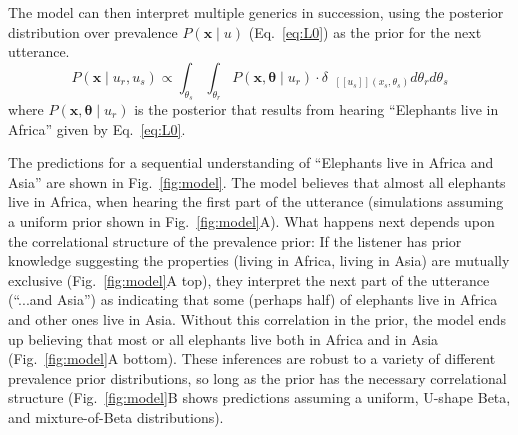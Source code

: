 \documentclass[10pt,letterpaper]{article}
\newcommand{\denote}[1]{\mbox{ $[\![ #1 ]\!]$}}
\begin{document}
The model can then interpret multiple generics in succession, using the posterior distribution over prevalence $P(\textbf{x} \mid u)$ (Eq.~\ref{eq:L0}) as the prior for the next utterance. 
\begin{equation}
P(\textbf{x} \mid u_{r}, u_{s}) \propto  \int_{\theta_s} \int_{\theta_r}P(\textbf{x}, \boldsymbol{\theta} \mid u_{r})  \cdot \delta_{\denote{u_{s}}(x_{s}, \theta_{s})} d\theta_r d\theta_s%
\label{eq:L0a}
\end{equation}
\noindent where $P(\textbf{x}, \boldsymbol{\theta} \mid u_{r})$  is the posterior that results from hearing ``Elephants live in Africa'' given by Eq.~\ref{eq:L0}.

The predictions for a sequential understanding of ``Elephants live in Africa and Asia'' are shown in Fig.~\ref{fig:model}.
The model believes that almost all elephants live in Africa, when hearing the first part of the utterance (simulations assuming a uniform prior shown in Fig.~\ref{fig:model}A). 
What happens next depends upon the correlational structure of the prevalence prior: If the listener has prior knowledge suggesting the properties (living in Africa, living in Asia) are mutually exclusive (Fig.~\ref{fig:model}A top), they interpret the next part of the utterance (``...and Asia'') as indicating that some (perhaps half) of elephants live in Africa and other ones live in Asia. 
Without this correlation in the prior, the model ends up believing that most or all elephants live both in Africa and in Asia  (Fig.~\ref{fig:model}A bottom).
These inferences are robust to a variety of different prevalence prior distributions, so long as the prior has the necessary correlational structure (Fig.~\ref{fig:model}B shows predictions assuming a uniform, U-shape Beta, and mixture-of-Beta distributions).

\end{document}
